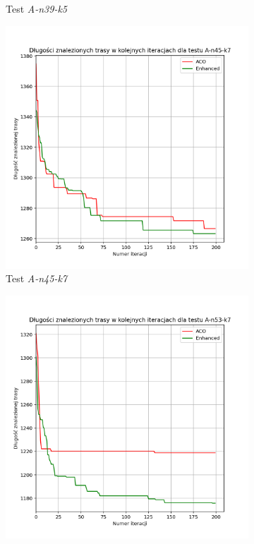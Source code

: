 \documentclass[10pt]{article}
\begin{document}
\begin{figure}[H]
\begin{subfigure}[b]{0.4\textwidth}
         \caption{Test \textit{A-n39-k5}}
     \end{subfigure}
     \hfill
     \begin{subfigure}[b]{0.4\textwidth}
         \centering
         \includegraphics[width=\textwidth]{iterations_enhanced_3.png}
         \caption{Test \textit{A-n45-k7}}
     \end{subfigure}
     \hfill
     \begin{subfigure}[b]{0.4\textwidth}
         \centering
         \includegraphics[width=\textwidth]{iterations_enhanced_4.png}

\end{subfigure}
\end{figure}
\end{document}
